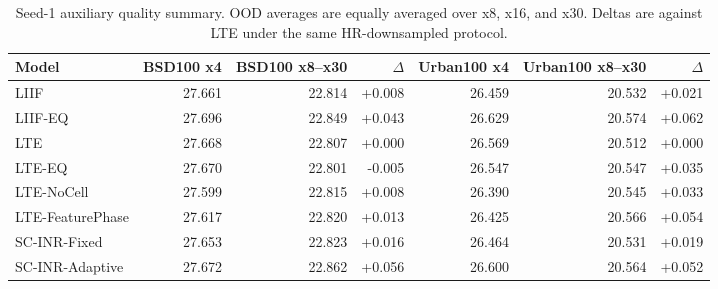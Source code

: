 \begin{table}[t]
\centering
\small
\caption{Seed-1 auxiliary quality summary. OOD averages are equally averaged over x8, x16, and x30. Deltas are against LTE under the same HR-downsampled protocol.}
\label{tab:seed1_aux_quality_psnr}
\begin{tabular}{lrrrrrr}
\toprule
Model & BSD100 x4 & BSD100 x8--x30 & $\Delta$ & Urban100 x4 & Urban100 x8--x30 & $\Delta$ \\
\midrule
LIIF & 27.661 & 22.814 & +0.008 & 26.459 & 20.532 & +0.021 \\
LIIF-EQ & 27.696 & 22.849 & +0.043 & 26.629 & 20.574 & +0.062 \\
LTE & 27.668 & 22.807 & +0.000 & 26.569 & 20.512 & +0.000 \\
LTE-EQ & 27.670 & 22.801 & -0.005 & 26.547 & 20.547 & +0.035 \\
LTE-NoCell & 27.599 & 22.815 & +0.008 & 26.390 & 20.545 & +0.033 \\
LTE-FeaturePhase & 27.617 & 22.820 & +0.013 & 26.425 & 20.566 & +0.054 \\
SC-INR-Fixed & 27.653 & 22.823 & +0.016 & 26.464 & 20.531 & +0.019 \\
SC-INR-Adaptive & 27.672 & 22.862 & +0.056 & 26.600 & 20.564 & +0.052 \\
\bottomrule
\end{tabular}
\end{table}
